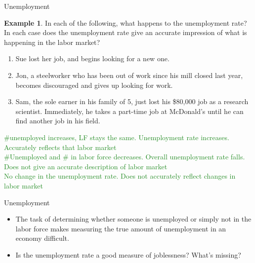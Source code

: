 \documentclass[xcolor={dvipsnames},pdf, hyperref={colorlinks=true, citecolor=ForestGreen, linkcolor=BlueViolet, urlcolor=Magenta}]{beamer}
\theoremstyle{definition}
\newtheorem{exmp}{Example}[section]
\newcommand{\ddp}[1]{{\textcolor{ForestGreen}{#1}}}
\begin{document}
\begin{frame}{Unemployment}
\begin{exmp} 
	\scriptsize
	In each of the following, what happens to the unemployment rate? In each case does the unemployment rate give an accurate impression of what is happening in the labor market?
	\begin{enumerate}
		\item Sue lost her job, and begins looking for a new one. 
		\item Jon, a steelworker who has been out of work since his mill closed last year, becomes discouraged and gives up looking for work. 
		\item Sam, the sole earner in his family of 5, just lost his \$80,000 job as a research scientist. Immediately, he takes a part-time job at McDonald's until he can find another job in his field.
	\end{enumerate}
\end{exmp}
\scriptsize
\ddp{\pause \#unemployed increases, LF stays the same. Unemployment rate increases. Accurately reflects that labor market \\
\pause \#Unemployed and \# in labor force decreases. Overall unemployment rate falls. Does not give an accurate description of labor market \\
\pause No change in the unemployment rate. Does not accurately reflect changes in labor market}
\end{frame}


\begin{frame}{Unemployment}
\begin{itemize}
	\item The task of determining whether someone is unemployed or simply not in the labor force makes measuring the true amount of unemployment in an economy difficult. 
	\item Is the unemployment rate a good measure of joblessness? What's missing? 
\end{itemize}
\end{frame}
\end{document}
